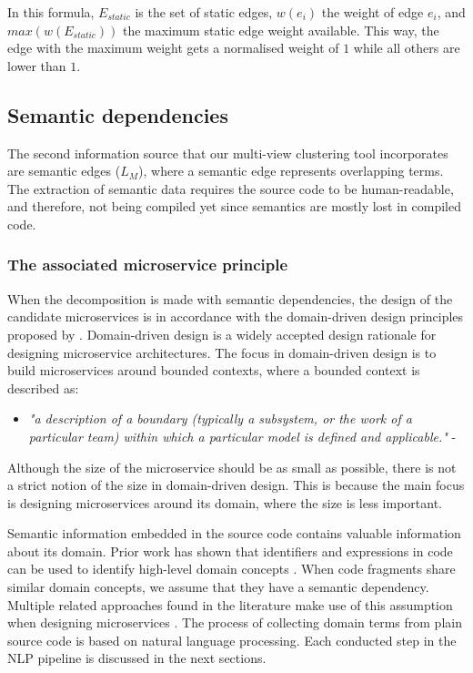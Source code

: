 \noindent
In this formula, $E_{static}$ is the set of static edges, $w(e_{i})$ the weight of edge $e_{i}$, and $max(w(E_{static}))$ the maximum static edge weight available. This way, the edge with the maximum weight gets a normalised weight of $1$ while all others are lower than $1$.

\subsection{Semantic dependencies}\label{ss:semantic_dependencies}
The second information source that our multi-view clustering tool incorporates are semantic edges ($L_M$), where a semantic edge represents overlapping terms.
The extraction of semantic data requires the source code to be human-readable, and therefore, not being compiled yet since semantics are mostly lost in compiled code.
 
\subsubsection{The associated microservice principle}
When the decomposition is made with semantic dependencies, the design of the candidate microservices is in accordance with the domain-driven design principles proposed by \citeauthor{evans2004domain} \cite{evans2004domain}. Domain-driven design is a widely accepted design rationale for designing microservice architectures. The focus in domain-driven design is to build microservices around bounded contexts, where a bounded context is described as:

\begin{itemize}
    \item[] \textit{"a description of a boundary (typically a subsystem, or the work of a particular team) within which a particular model is defined and applicable."} - \citeauthor{evans2004domain} \cite{evans2004domain}
\end{itemize}

Although the size of the microservice should be as small as possible, there is not a strict notion of the size in domain-driven design. This is because the main focus is designing microservices around its domain, where the size is less important. \par
Semantic information embedded in the source code contains valuable information about its domain. Prior work has shown that identifiers and expressions in code can be used to identify high-level domain concepts \cite{marcus2001identification}. When code fragments share similar domain concepts, we assume that they have a semantic dependency. Multiple related approaches found in the literature make use of this assumption when designing microservices \cite{brito2021identification, jin2019service, lohnertz2020steinmetz, mazlami2017extraction}. The process of collecting domain terms from plain source code is based on natural language processing. Each conducted step in the NLP pipeline is discussed in the next sections.

